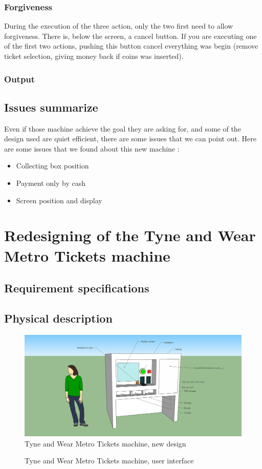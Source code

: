 \documentclass[a4paper,12pt]{article} %
\begin{document}
\subsubsection{Forgiveness}
During the execution of the three action, only the two first need to allow forgiveness. There is, below the screen, a cancel button. If you are executing one of the first two actions, pushing this button cancel everything was begin (remove ticket selection, giving money back if coins was inserted).

\subsubsection{Output}


\subsection{Issues summarize}
Even if those machine achieve the goal they are asking for, and some of the design used are quiet efficient, there are some issues that we can point out.
Here are some issues that we found about this new machine : 
\begin{itemize}
\item Collecting box position
\item Payment only by cash
\item Screen position and display
\end{itemize}

\section{Redesigning  of the Tyne and Wear Metro Tickets machine}
\subsection{Requirement specifications}
\subsection{Physical description}
\begin{figure}[h!]
\includegraphics[width=1.3\linewidth]{ID.png}
\caption{\label{new} Tyne and Wear Metro Tickets machine, new design}
\end{figure}
\begin{figure}[h!]
\caption{\label{new} Tyne and Wear Metro Tickets machine, user interface}
\end{figure}
\end{document}
